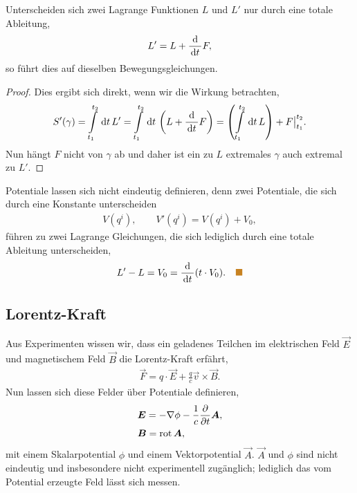 \begin{bemn}
Unterscheiden sich zwei Lagrange Funktionen $L$ und $L'$ nur durch eine totale
Ableitung,
\begin{align*}
L' = L + \frac{\mathrm{d}}{\,\mathrm{d} t\,}F,
\end{align*}
so führt dies auf dieselben Bewegungsgleichungen.\maphere
\end{bemn}
\begin{proof}
Dies ergibt sich direkt, wenn wir die Wirkung betrachten,
\begin{align*}
S'(\gamma) = 
\int\limits_{t_1}^{t_2} \,\mathrm{d} t\, L' =
\int\limits_{t_1}^{t_2} \,\mathrm{d} t\, \left(L + \frac{\mathrm{d}}{\,\mathrm{d} t\,} F\right) =
\left(\int\limits_{t_1}^{t_2} \,\mathrm{d} t\, L\right) + F\big|_{t_1}^{t_2}. 
\end{align*}
Nun hängt $F$ nicht von $\gamma$ ab und daher ist ein zu $L$ extremales
$\gamma$ auch extremal zu $L'$.\qedhere
\end{proof}

\begin{bsp}
Potentiale lassen sich nicht eindeutig definieren, denn zwei Potentiale, die
sich durch eine Konstante unterscheiden
\begin{align*}
V(q^i),\qquad V'(q^i) = V(q^i) + V_0,
\end{align*}
führen zu zwei Lagrange Gleichungen, die sich lediglich durch eine totale
Ableitung unterscheiden,
\begin{align*}
L' - L = V_0 = \frac{\diffd}{\dt}(t\cdot V_0).\bsphere
\end{align*}
\end{bsp}

\subsection{Lorentz-Kraft}
Aus Experimenten wissen wir, dass ein geladenes Teilchen im elektrischen Feld
$\vec{E}$ und magnetischem Feld $\vec{B}$ die Lorentz-Kraft erfährt,
\begin{align*}
\vec{F} = q\cdot\vec{E} + \frac{q}{c}\vec{v}\times\vec{B}.
\end{align*}
Nun lassen sich diese Felder über Potentiale definieren,
\begin{align*}
&\bm{E} = -\nabla \phi - \frac{1}{c}\frac{\partial}{\partial
t}\bm{A},\\& \bm{B} = \operatorname{rot}\bm{A},
\end{align*} 
mit einem Skalarpotential $\phi$ und einem Vektorpotential $\vec{A}$. $\vec{A}$
und $\phi$ sind nicht eindeutig und insbesondere nicht experimentell zugänglich;
lediglich das vom Potential erzeugte Feld lässt sich messen.

